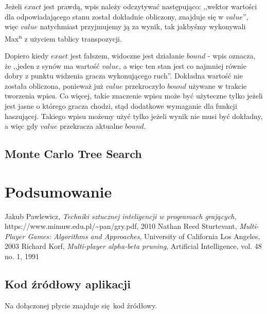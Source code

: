 \documentclass{pracamgr}
\begin{document}
Jeżeli \(exact\) jest prawdą, wpis należy odczytywać następująco: ,,wektor wartości dla odpowiadającego stanu został dokładnie obliczony, znajduje się w \(value\)'', więc \(value\) natychmiast przyjmujemy ją za wynik, tak jakbyśmy wykonywali Max\textsuperscript{n} z użyciem tablicy transpozycji.

Dopiero kiedy \(exact\) jest fałszem, widoczne jest działanie \(bound\) - wpis oznacza, że ,,jeden z synów ma wartość \(value\), a więc ten stan jest co najmniej równie dobry z punktu widzenia gracza wykonującego ruch''. Dokładna wartość nie została obliczona, ponieważ już \(value\) przekroczyło \(bound\) używane w trakcie tworzenia wpisu.
Co więcej, takie znaczenie wpisu może być użyteczne tylko jeżeli jest jasne o którego gracza chodzi, stąd dodatkowe wymaganie dla funkcji haszującej.
Takiego wpisu możemy użyć tylko jeżeli wynik nie musi być dokładny, a więc gdy \(value\) przekracza aktualne \(bound\).

\section{Monte Carlo Tree Search}

\chapter{Podsumowanie}

\begin{thebibliography}{98}

 Jakub Pawlewicz, \textit{Techniki sztucznej inteligencji
    w programach grających}, https://www.mimuw.edu.pl/\textasciitilde{}pan/gry.pdf, 2010
 Nathan Reed Sturtevant, \textit{Multi-Player Games: Algorithms and Approaches}, University of California Los Angeles, 2003
 Richard Korf, \textit{Multi-player alpha-beta pruning}, Artificial Intelligence, vol. 48 no. 1, 1991

\end{thebibliography}

\begin{appendices}

\chapter{Kod źródłowy aplikacji}
Na dołączonej płycie znajduje się kod źródłowy.

\end{appendices}
\end{document}
